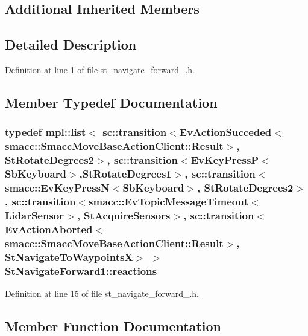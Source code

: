 \subsection*{Additional Inherited Members}


\subsection{Detailed Description}


Definition at line 1 of file st\+\_\+navigate\+\_\+forward\+\_.\+h.



\subsection{Member Typedef Documentation}
\subsubsection[{\texorpdfstring{reactions}{reactions}}]{\setlength{\rightskip}{0pt plus 5cm}typedef mpl\+::list$<$ sc\+::transition$<$Ev\+Action\+Succeded$<$smacc\+::\+Smacc\+Move\+Base\+Action\+Client\+::\+Result$>$, {\bf St\+Rotate\+Degrees2}$>$, sc\+::transition$<$Ev\+Key\+PressP$<$Sb\+Keyboard$>$,{\bf St\+Rotate\+Degrees1}$>$, sc\+::transition$<${\bf smacc\+::\+Ev\+Key\+PressN}$<$Sb\+Keyboard$>$, {\bf St\+Rotate\+Degrees2}$>$, sc\+::transition$<${\bf smacc\+::\+Ev\+Topic\+Message\+Timeout}$<${\bf Lidar\+Sensor}$>$, {\bf St\+Acquire\+Sensors}$>$, sc\+::transition$<$Ev\+Action\+Aborted$<$smacc\+::\+Smacc\+Move\+Base\+Action\+Client\+::\+Result$>$, {\bf St\+Navigate\+To\+WaypointsX}$>$ $>$ {\bf St\+Navigate\+Forward1\+::reactions}}\hypertarget{structStNavigateForward1_a9f249e99bd15cb030021ff692ea8269c}{}\label{structStNavigateForward1_a9f249e99bd15cb030021ff692ea8269c}


Definition at line 15 of file st\+\_\+navigate\+\_\+forward\+\_.\+h.



\subsection{Member Function Documentation}
